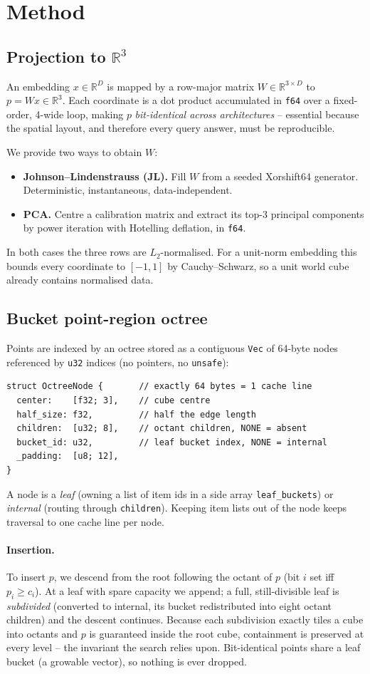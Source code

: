 \documentclass[11pt]{article}
\begin{document}
\section{Method}
\subsection{Projection to $\mathbb{R}^3$}
An embedding $x\in\mathbb{R}^D$ is mapped by a row-major matrix
$W\in\mathbb{R}^{3\times D}$ to $p = Wx \in \mathbb{R}^3$. Each coordinate is a dot
product accumulated in \texttt{f64} over a fixed-order, 4-wide loop, making $p$
\emph{bit-identical across architectures} -- essential because the spatial layout,
and therefore every query answer, must be reproducible.

We provide two ways to obtain $W$:
\begin{itemize}
  \item \textbf{Johnson--Lindenstrauss (JL).} Fill $W$ from a seeded Xorshift64
  generator. Deterministic, instantaneous, data-independent.
  \item \textbf{PCA.} Centre a calibration matrix and extract its top-3 principal
  components by power iteration with Hotelling deflation, in \texttt{f64}.
\end{itemize}
In both cases the three rows are $L_2$-normalised. For a unit-norm embedding this
bounds every coordinate to $[-1,1]$ by Cauchy--Schwarz, so a unit world cube
already contains normalised data.

\subsection{Bucket point-region octree}
Points are indexed by an octree stored as a contiguous \texttt{Vec} of 64-byte
nodes referenced by \texttt{u32} indices (no pointers, no \texttt{unsafe}):
\begin{lstlisting}
struct OctreeNode {       // exactly 64 bytes = 1 cache line
  center:    [f32; 3],    // cube centre
  half_size: f32,         // half the edge length
  children:  [u32; 8],    // octant children, NONE = absent
  bucket_id: u32,         // leaf bucket index, NONE = internal
  _padding:  [u8; 12],
}
\end{lstlisting}
A node is a \emph{leaf} (owning a list of item ids in a side array
\texttt{leaf\_buckets}) or \emph{internal} (routing through \texttt{children}).
Keeping item lists out of the node keeps traversal to one cache line per node.

\paragraph{Insertion.} To insert $p$, we descend from the root following the
octant of $p$ (bit $i$ set iff $p_i \ge c_i$). At a leaf with spare capacity we
append; a full, still-divisible leaf is \emph{subdivided} (converted to internal,
its bucket redistributed into eight octant children) and the descent continues.
Because each subdivision exactly tiles a cube into octants and $p$ is guaranteed
inside the root cube, containment is preserved at every level -- the invariant the
search relies upon. Bit-identical points share a leaf bucket (a growable vector),
so nothing is ever dropped.
\end{document}
